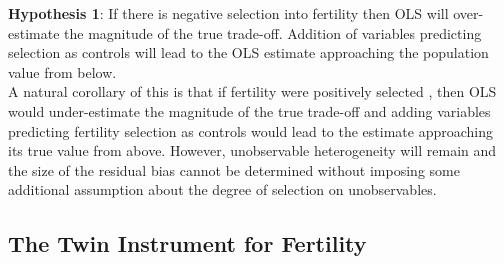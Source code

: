 \documentclass[subeqn]{article}
\begin{document}
\begin{spacing}{1.4}

\noindent %
\textbf{Hypothesis 1}: If there is negative selection into fertility then OLS will over-estimate the magnitude of the true trade-off. Addition of variables predicting selection as controls will lead to the OLS estimate approaching the population value from below.\\
A natural corollary of this is that if fertility were positively selected \citep{Fortetal2016,Myrskylaetal2009}, then OLS would under-estimate the magnitude of the true trade-off and adding variables predicting fertility selection as controls would lead to the estimate approaching its true value from above. However, unobservable heterogeneity will remain and the size of the residual bias cannot be determined without imposing some additional assumption about the degree of selection on unobservables.


\subsection{The Twin Instrument for Fertility}
\label{sscn:validIV}


\end{spacing}
\end{document}
